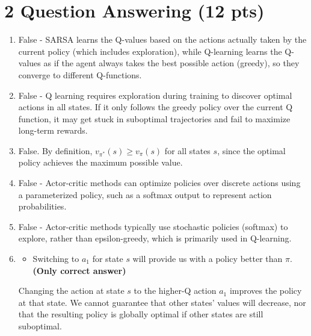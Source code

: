 \documentclass[12pt]{article}
\begin{document}
\section*{2 Question Answering (12 pts)}
\begin{enumerate}
    \item \noindent\begin{solution}[height=5cm] 
    False - SARSA learns the Q-values based on the actions actually taken by the current policy (which includes exploration), while Q-learning learns the Q-values as if the agent always takes the best possible action (greedy), so they converge to different Q-functions.
    \end{solution}

    \item \noindent\begin{solution}[height=5cm]
        False - Q learning requires exploration during training to discover optimal actions in all states. If it only follows the greedy policy over the current Q function, it may get stuck in suboptimal trajectories and fail to maximize long-term rewards.
    \end{solution}

    \item \noindent\begin{solution}[height=5cm]
    False. By definition, \(v_{\pi^*}(s) \geq v_{\pi}(s)\) for all states \(s\), since the optimal policy achieves the maximum possible value.
    \end{solution}

    \item \noindent\begin{solution}[height=5cm]
    False - Actor-critic methods can optimize policies over discrete actions using a parameterized policy, such as a softmax output to represent action probabilities.
    \end{solution}

    \item \noindent\begin{solution}[height=5cm]
    False - Actor-critic methods typically use stochastic policies (softmax) to explore, rather than epsilon-greedy, which is primarily used in Q-learning.
    \end{solution}

    \item \noindent\begin{solution}[height=5cm]
    \begin{itemize}
        \item Switching to $a_1$ for state $s$ will provide us with a policy better than $\pi$. \textbf{(Only correct answer)}
    \end{itemize}
    Changing the action at state $s$ to the higher-Q action $a_1$ improves the policy at that state. We cannot guarantee that other states’ values will decrease, nor that the resulting policy is globally optimal if other states are still suboptimal.
    \end{solution}


\end{enumerate}
\end{document}
